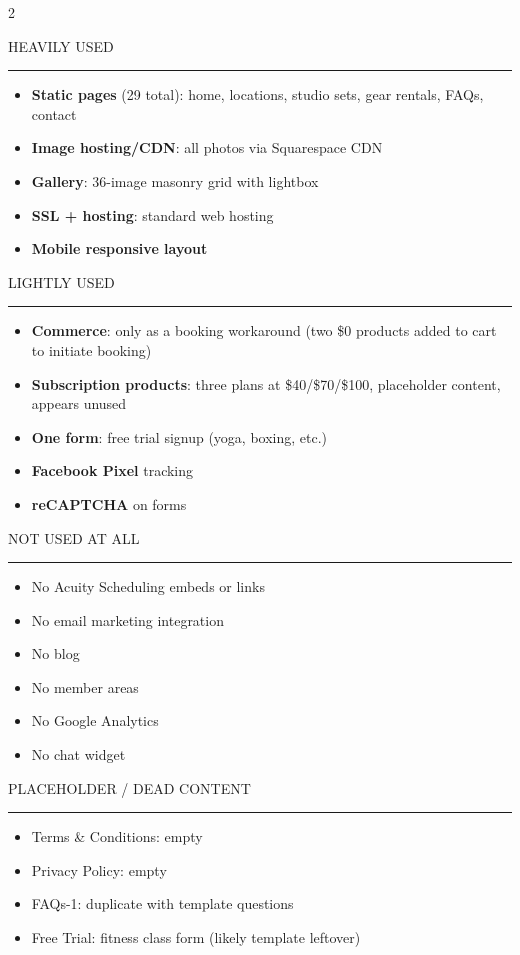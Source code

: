 \documentclass[10pt,letterpaper]{article}
\newcommand{\reportsubsection}[1]{%
  \vspace{6pt}%
  {\intersemibold\fontsize{9}{11}\selectfont\color{wwsDark}\MakeUppercase{#1}}%
  \par\vspace{1pt}%
  {\color{wwsGray}\rule{\linewidth}{0.4pt}}%
  \par\vspace{3pt}%
}
\begin{document}
\begin{multicols}{2}

\reportsubsection{Heavily Used}
\begin{itemize}
  \item \textbf{Static pages} (29 total): home, locations, studio sets, gear rentals, FAQs, contact
  \item \textbf{Image hosting/CDN}: all photos via Squarespace CDN
  \item \textbf{Gallery}: 36-image masonry grid with lightbox
  \item \textbf{SSL + hosting}: standard web hosting
  \item \textbf{Mobile responsive layout}
\end{itemize}

\reportsubsection{Lightly Used}
\begin{itemize}
  \item \textbf{Commerce}: only as a booking workaround (two \$0 products added to cart to initiate booking)
  \item \textbf{Subscription products}: three plans at \$40/\$70/\$100, placeholder content, appears unused
  \item \textbf{One form}: free trial signup (yoga, boxing, etc.)
  \item \textbf{Facebook Pixel} tracking
  \item \textbf{reCAPTCHA} on forms
\end{itemize}

\columnbreak

\reportsubsection{Not Used At All}
\begin{itemize}
  \item No Acuity Scheduling embeds or links
  \item No email marketing integration
  \item No blog
  \item No member areas
  \item No Google Analytics
  \item No chat widget
\end{itemize}

\reportsubsection{Placeholder / Dead Content}
\begin{itemize}
  \item Terms \& Conditions: empty
  \item Privacy Policy: empty
  \item FAQs-1: duplicate with template questions
  \item Free Trial: fitness class form (likely template leftover)
\end{itemize}

\end{multicols}
\end{document}
